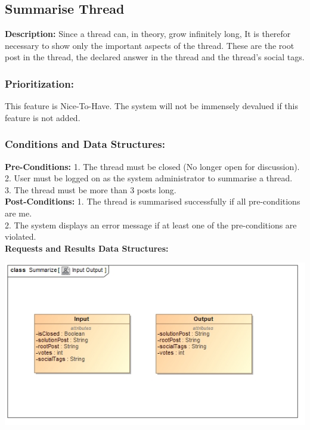 \documentclass[a4paper,11pt]{article}
\begin{document}
\subsection{Summarise Thread}
\textbf{Description:}
Since a thread can, in theory, grow infinitely long, It is therefor necessary to show only the important aspects of the thread. These are the root post in the thread, the declared answer in the thread and the thread's social tags.\\
\subsubsection{Prioritization:}
This feature is Nice-To-Have. The system will not be immensely devalued if this feature is not added.\\ 
\subsubsection{Conditions and Data Structures:}
\textbf{Pre-Conditions:}
1.	The thread must be closed (No longer open for discussion).\\
2.	User must be logged on as the system administrator to summarise a thread.\\
3.	The thread must be more than 3 posts long.\\
\textbf{Post-Conditions:}
1.	The thread is summarised successfully if all pre-conditions are me.\\
2.	The system displays an error message if at least one of the pre-conditions are violated.\\
\textbf{Requests and Results Data Structures:}
\begin{center}
\includegraphics[width=1\linewidth]{Images/SCHMThread/SummarizeInOut.jpg}\\
\end{center}
\end{document}
